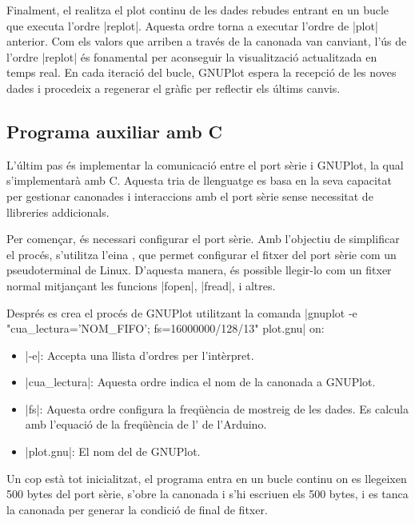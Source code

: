 \documentclass{tfgitic}[2023/07/07]
\begin{document}
Finalment, el  realitza el plot continu de les dades
rebudes entrant en un bucle que executa l'ordre \ord|replot|. Aquesta
ordre torna a executar l'ordre de \ord|plot| anterior. Com els valors
que arriben a través de la canonada van canviant, l'ús de l'ordre
\ord|replot| és fonamental per aconseguir la visualització
actualitzada en temps real. En cada iteració del bucle, GNUPlot espera
la recepció de les noves dades i procedeix a regenerar el gràfic per
reflectir els últims canvis.

\subsection{Programa auxiliar amb C}

L'últim pas és implementar la comunicació entre el port sèrie i
GNUPlot, la qual s'implementarà amb C. Aquesta tria de llenguatge
es basa en la seva capacitat per gestionar canonades i interaccions
amb el port sèrie sense necessitat de llibreries addicionals.

\newpage

Per començar, és necessari configurar el port sèrie. Amb l'objectiu de
simplificar el procés, s'utilitza l'eina \cite[stty]{stty}, que permet
configurar el fitxer del port sèrie com un pseudoterminal de
Linux. D'aquesta manera, és possible llegir-lo com un fitxer normal
mitjançant les funcions \ord|fopen|, \ord|fread|, i altres.

Després es crea el procés de GNUPlot utilitzant la comanda
\ord|gnuplot -e "cua\_lectura='NOM\_FIFO'; fs=16000000/128/13" plot.gnu|
on:

\begin{itemize}
      \item \ord|-e|: Accepta una llista d'ordres per l'intèrpret.
      \item \ord|cua\_lectura|: Aquesta ordre indica el nom de la
        canonada a GNUPlot.
      \item \ord|fs|: Aquesta ordre configura la freqüència de
        mostreig de les dades. Es calcula amb l'equació de la
        freqüència de l' de l'Arduino.
      \item \ord|plot.gnu|: El nom del  de GNUPlot.
\end{itemize}

Un cop està tot inicialitzat, el programa entra en un bucle continu on
es llegeixen \num{500} bytes del port sèrie, s'obre la canonada i s'hi
escriuen els \num{500} bytes, i es tanca la canonada per generar la
condició de final de fitxer.
\end{document}
